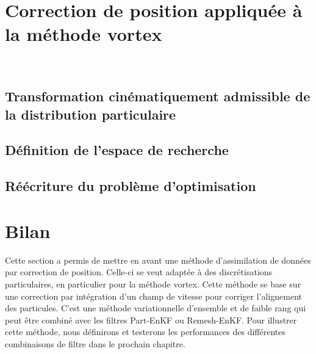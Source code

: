 \section{Correction de position appliquée à la méthode vortex}~\label{sec:align_vortex}

\subsection{Transformation cinématiquement admissible de la distribution particulaire}

\subsection{Définition de l'espace de recherche}

\subsection{Réécriture du problème d'optimisation}

\section{Bilan}

Cette section a permis de mettre en avant une méthode d'assimilation de données par correction de position. Celle-ci se veut adaptée à des discrétisations particulaires, en particulier pour la méthode vortex. Cette méthode se base sur une correction par intégration d'un champ de vitesse pour corriger l'alignement des particules. C'est une méthode variationnelle d'ensemble et de faible rang qui peut être combiné avec les filtres Part-EnKF ou Remesh-EnKF. Pour illustrer cette méthode, nous définirons et testerons les performances des différentes combinaisons de filtre dans le prochain chapitre.